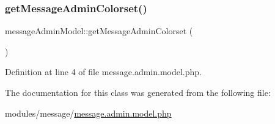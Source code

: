 \subsubsection{\texorpdfstring{get\+Message\+Admin\+Colorset()}{getMessageAdminColorset()}}
{\footnotesize\ttfamily message\+Admin\+Model\+::get\+Message\+Admin\+Colorset (\begin{DoxyParamCaption}{ }\end{DoxyParamCaption})}



Definition at line 4 of file message.\+admin.\+model.\+php.



The documentation for this class was generated from the following file\+:\begin{DoxyCompactItemize}
\item 
modules/message/\hyperlink{message_8admin_8model_8php}{message.\+admin.\+model.\+php}\end{DoxyCompactItemize}

